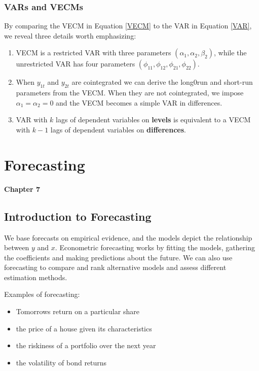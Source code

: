 \documentclass[11pt]{article}
\begin{document}
\subsubsection{VARs and VECMs}

By comparing the VECM in Equation \eqref{VECM} to the VAR in Equation \eqref{VAR}, we reveal three details worth emphasizing:
\begin{enumerate}
    \item VECM is a restricted VAR with three parameters $(\alpha_1,\alpha_2,\beta_2)$, while the unrestricted VAR has four parameters $(\phi_{11},\phi_{12}, \phi_{21},\phi_{22})$.
    \item When $y_{1t}$ and $y_{2t}$ are cointegrated we can derive the long0run and short-run parameters from the VECM. When they are not cointegrated, we impose $\alpha_1 = \alpha_2 = 0$ and the VECM becomes a simple VAR in differences.
    \item VAR with $k$ lags of dependent variables on \textbf{levels} is equivalent to a VECM with $k-1$ lags of dependent variables on \textbf{differences}.
\end{enumerate}




\newpage
\section{Forecasting}
\textbf{Chapter 7}

\subsection{Introduction to Forecasting}
We base forecasts on empirical evidence, and the models depict the relationship between $y$ and $x$. Econometric forecasting works by fitting the models, gathering the coefficients and making predictions about the future. We can also use forecasting to compare and rank alternative models and assess different estimation methods.

Examples of forecasting:
\begin{itemize}
    \item Tomorrows return on a particular share
    \item the price of a house given its characteristics
    \item the riskiness of a portfolio over the next year
    \item the volatility of bond returns
\end{itemize}
\end{document}
